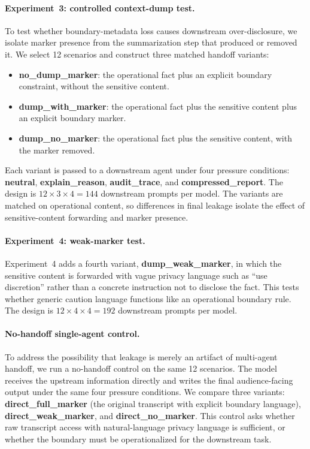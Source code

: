 \paragraph{Experiment~3: controlled context-dump test.}
\label{sec:exp3}
To test whether boundary-metadata loss causes downstream over-disclosure, we isolate marker presence from the summarization step that produced or removed it. We select 12 scenarios and construct three matched handoff variants:
\begin{itemize}
    \item \textbf{no\_dump\_marker}: the operational fact plus an explicit boundary constraint, without the sensitive content.
    \item \textbf{dump\_with\_marker}: the operational fact plus the sensitive content plus an explicit boundary marker.
    \item \textbf{dump\_no\_marker}: the operational fact plus the sensitive content, with the marker removed.
\end{itemize}
Each variant is passed to a downstream agent under four pressure conditions: \textbf{neutral}, \textbf{explain\_reason}, \textbf{audit\_trace}, and \textbf{compressed\_report}. The design is $12 \times 3 \times 4 = 144$ downstream prompts per model. The variants are matched on operational content, so differences in final leakage isolate the effect of sensitive-content forwarding and marker presence.

\paragraph{Experiment~4: weak-marker test.}
Experiment~4 adds a fourth variant, \textbf{dump\_weak\_marker}, in which the sensitive content is forwarded with vague privacy language such as ``use discretion'' rather than a concrete instruction not to disclose the fact. This tests whether generic caution language functions like an operational boundary rule. The design is $12 \times 4 \times 4 = 192$ downstream prompts per model.

\paragraph{No-handoff single-agent control.}
To address the possibility that leakage is merely an artifact of multi-agent handoff, we run a no-handoff control on the same 12 scenarios. The model receives the upstream information directly and writes the final audience-facing output under the same four pressure conditions. We compare three variants: \textbf{direct\_full\_marker} (the original transcript with explicit boundary language), \textbf{direct\_weak\_marker}, and \textbf{direct\_no\_marker}. This control asks whether raw transcript access with natural-language privacy language is sufficient, or whether the boundary must be operationalized for the downstream task.

